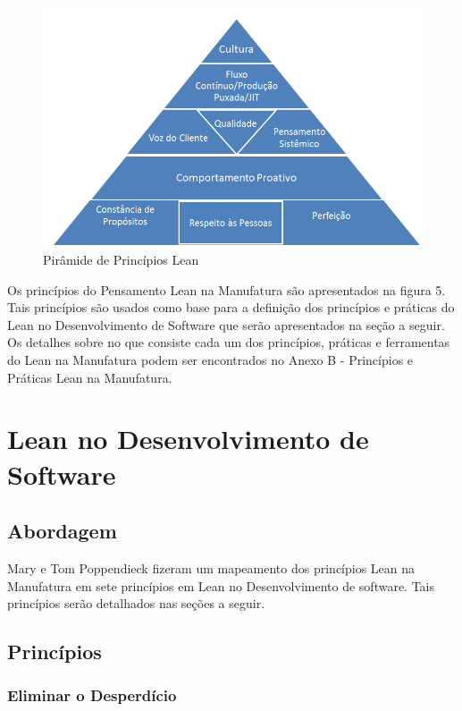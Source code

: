 \begin{figure}[h]
		\centering
		\label{fig02}
			\includegraphics[scale=0.7]{figuras/principioslean.png}
		\caption{Pirâmide de Princípios Lean}
\end{figure}

Os princípios do Pensamento Lean na Manufatura são apresentados na figura 5. Tais princípios são usados como base para a definição dos princípios e práticas do Lean no Desenvolvimento de Software que serão apresentados na seção a seguir. Os detalhes sobre no que consiste cada um dos princípios, práticas e ferramentas do Lean na Manufatura podem ser encontrados no Anexo B - Princípios e Práticas Lean na Manufatura.

\section[Lean no Desenvolvimento de Software]{Lean no Desenvolvimento de Software}

\subsection[Abordagem]{Abordagem}

Mary e Tom Poppendieck fizeram um mapeamento dos princípios Lean na Manufatura em sete princípios em Lean no Desenvolvimento de software. Tais princípios serão detalhados nas seções a seguir. 

\subsection[Princípios]{Princípios}

\subsubsection[Eliminar o Desperdício]{Eliminar o Desperdício}

